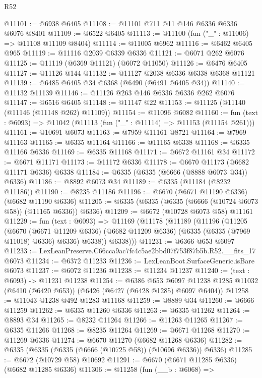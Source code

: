 \begin{lexlean}{R52}
\begin{coremodule}
@11101 := @6938 @6405
@11108 := @11101 @711 @11 @146 @6336 @6336 @6076 @8401
@11109 := @6522 @6405
@11113 := @11100 (fun ("_" : @11006) => @11108 @11109 @8404)
@11114 := @11005 @6962
@11116 := @6462 @6405 @965
@11119 := @11116 @2039 @6339 @6336
@11121 := @6071 @262 @6076
@11125 := @11119 (@6369 @11121) (@6072 @11050)
@11126 := @6476 @6405
@11127 := @11126 @144
@11132 := @11127 @2038 @6336 @6338 @6368 @11121
@11139 := @6485 @6405 @34 @6368 (@6490 (@6491 @6405 @34))
@11140 := @11132 @11139
@11146 := @11126 @263 @146 @6336 @6336 @262 @6076
@11147 := @6516 @6405
@11148 := @11147 @22
@11153 := @11125 (@11140 (@11146 (@11148 @262) @11109))
@11154 := @11096 @6082
@11160 := fun (text : @6093) => @11042 (@11113 (fun ("_" : @11114) => @11153 (@11154 @261)))
@11161 := @10691 @6073
@11163 := @7959 @11161 @8721
@11164 := @7969 @11163
@11165 := @6335 @11164
@11166 := @11165 @6338
@11168 := @6335 @11166 @6336
@11169 := @6335 @11168
@11171 := @6672 @11161 @34
@11172 := @6671 @11171
@11173 := @11172 @6336
@11178 := @6670 @11173 (@6682 @11171 @6336) @6338
@11184 := @6335 (@6335 (@6666 (@8888 @6073 @34)) @6336)
@11186 := @8892 @6073 @34
@11189 := @6335 (@11184 (@8232 @11186))
@11190 := @8235 @11186
@11196 := @6670 (@6671 @11190 @6336) (@6682 @11190 @6336)
@11205 := @6335 (@6335 (@6335 (@6666 (@10724 @6073 @58)) (@11165 @6336)) @6336)
@11209 := @6672 (@10728 @6073 @58) @11161
@11229 := fun (text : @6093) =>
  @11169
    (@11178
      (@11189
        (@11196
          (@11205
            (@6670
              (@6671 @11209 @6336)
              (@6682 @11209 @6336)
              (@6335 (@6335 (@7969 @11018) @6336) @6336)
              @6338))
          @6338)))
@11231 := @6366 @653 @6097
@11233 := LexLeanPreserve.C66cca9ac7fc4c5ae2bbd07f753f87b5b.R52.__fits_17 @6073
@11234 := @6372 @11233
@11236 := LexLeanBoot.SurfaceGeneric.isBare @6073
@11237 := @6072 @11236
@11238 := @11234 @11237
@11240 := (text : @6093) -> @11231 @11238
@11254 := @6386
    @653
    @6097
    @11238
    @1285
    @11032
    (@6410 (@6420 @653))
    (@6426 (@6427 (@6428 @1285) @6097 @6404))
@11258 := @11043 @1238 @492 @1283 @11168
@11259 := @8889 @34
@11260 := @6666 @11259
@11262 := @6335 @11260 @6336
@11263 := @6335 @11262
@11264 := @8893 @34
@11265 := @8232 @11264
@11266 := @11263 @11265
@11267 := @6335 @11266
@11268 := @8235 @11264
@11269 := @6671 @11268
@11270 := @11269 @6336
@11274 := @6670 @11270 (@6682 @11268 @6336)
@11282 := @6335 (@6335 (@6335 (@6666 (@10725 @58)) (@10696 @6336)) @6336)
@11285 := @6672 (@10729 @58) @10692
@11291 := @6670 (@6671 @11285 @6336) (@6682 @11285 @6336)
@11306 := @11258
    (fun (__b : @6068) =>

\end{coremodule}
\end{lexlean}
